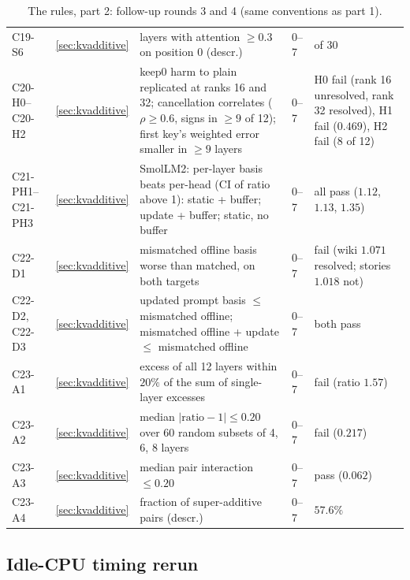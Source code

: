 \documentclass[10pt]{article}
\theoremstyle{plain}
\theoremstyle{definition}
\theoremstyle{remark}
\newcommand{\rl}[1]{\textsf{#1}}%
\begin{document}
\begin{table}[p]
\begin{tabularx}{\textwidth}{@{}>{\raggedright}p{2.4cm} >{\raggedright}p{0.7cm} >{\raggedright}X >{\raggedright}p{1.4cm} >{\raggedright\arraybackslash}p{4.0cm}@{}}
\rl{C19-S6} & \ref{sec:kvadditive} & layers with attention $\ge0.3$ on position 0 (descr.) & 0--7 & 18 of 30\\
\rl{C20-H0}--\rl{C20-H2} & \ref{sec:kvadditive} & keep0 harm to plain replicated at ranks 16 and 32; cancellation correlates ($\rho\ge0.6$, signs in $\ge9$ of 12); first key's weighted error smaller in $\ge9$ layers & 0--7 & H0 fail (rank 16 unresolved, rank 32 resolved), H1 fail ($0.469$), H2 fail (8 of 12)\\
\rl{C21-PH1}--\rl{C21-PH3} & \ref{sec:kvadditive} & SmolLM2: per-layer basis beats per-head (CI of ratio above 1): static + buffer; update + buffer; static, no buffer & 0--7 & all pass ($1.12$, $1.13$, $1.35$)\\
\rl{C22-D1} & \ref{sec:kvadditive} & mismatched offline basis worse than matched, on both targets & 0--7 & fail (wiki $1.071$ resolved; stories $1.018$ not)\\
\rl{C22-D2}, \rl{C22-D3} & \ref{sec:kvadditive} & updated prompt basis $\le$ mismatched offline; mismatched offline + update $\le$ mismatched offline & 0--7 & both pass\\
\rl{C23-A1} & \ref{sec:kvadditive} & excess of all 12 layers within $20\%$ of the sum of single-layer excesses & 0--7 & fail (ratio $1.57$)\\
\rl{C23-A2} & \ref{sec:kvadditive} & median $|\text{ratio}-1|\le0.20$ over 60 random subsets of 4, 6, 8 layers & 0--7 & fail ($0.217$)\\
\rl{C23-A3} & \ref{sec:kvadditive} & median pair interaction $\le0.20$ & 0--7 & pass ($0.062$)\\
\rl{C23-A4} & \ref{sec:kvadditive} & fraction of super-additive pairs (descr.) & 0--7 & $57.6\%$\\
\bottomrule
\end{tabularx}
\caption{The rules, part 2: follow-up rounds 3 and 4 (same conventions as part 1).}
\label{tab:rules2}
\end{table}

\FloatBarrier
\subsection{Idle-CPU timing rerun}
\label{app:rerun}
\end{document}
